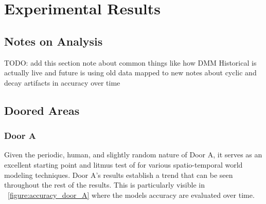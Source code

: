 

\chapter{Experimental Results}

\section{ Notes on Analysis }
TODO: add this section\?
note about common things like how DMM Historical is actually live and future is using old data mapped to new
notes about cyclic and decay artifacts in accuracy over time

\section{ Doored Areas }

\subsection { Door A }

Given the periodic, human, and slightly random nature of Door A, it serves as
an excellent starting point and litmus test of for various spatio-temporal
world modeling techniques. Door A's results establish a trend that can be seen
throughout the rest of the results. This is particularly visible in ~\ref{figure:accuracy_door_A}
where the models accuracy are evaluated over time. \\

\begin{table}[h!]
  \centering
  \caption{Door A Data Overview}
  \label{table:door_A}
\end{table}

